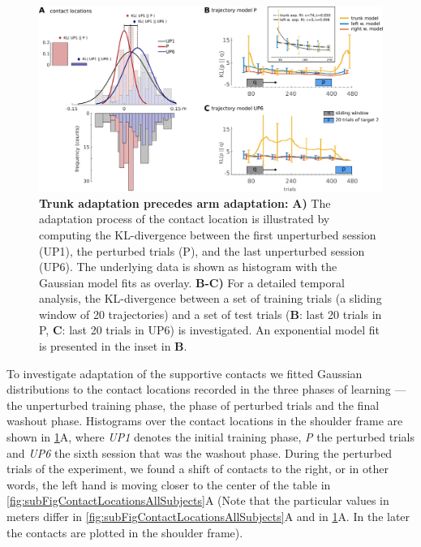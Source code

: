 \begin{figure}[t]
\centering
\includegraphics[width=\textwidth]{Elmar/picsClean/Fig4ModelComparison}
 \caption{\textbf{Trunk adaptation precedes arm adaptation:} 
 \textbf{A)} The adaptation process of the contact location is illustrated by computing the KL-divergence between the first unperturbed session (UP1), the perturbed trials (P), 
 and the last unperturbed session (UP6). The underlying data is shown as histogram with the Gaussian model fits as overlay.
 \textbf{B-C)} For a detailed temporal analysis, the KL-divergence between a set of training trials (a sliding window of 20 trajectories) and 
 a set of test trials (\textbf{B}: last 20 trials in P, \textbf{C}: last 20 trials in UP6) is investigated. 
 An exponential model fit is presented in the inset in \textbf{B}.  
}
\label{fig:OpsModelComparison}
\end{figure}

To investigate adaptation of the supportive contacts we fitted Gaussian 
distributions to the contact locations recorded in the three phases of learning 
--- the unperturbed training phase, the phase of perturbed trials and the final washout phase. 
Histograms over the contact locations in the shoulder frame are shown in \FigureAbbr \ref{fig:OpsModelComparison}A, 
where \textit{UP1} denotes the initial training phase, \textit{P} the perturbed trials and 
\textit{UP6} the sixth session that was the washout phase. During the perturbed trials of the experiment, 
we found a shift of contacts to the right, or in other words, the left hand is moving closer to the 
center of the table in \FigureAbbr \ref{fig:subFigContactLocationsAllSubjects}A 
(Note that the particular values in meters differ in \FigureAbbrP 
\ref{fig:subFigContactLocationsAllSubjects}A and in \FigureAbbrP 
\ref{fig:OpsModelComparison}A. In the later the contacts are plotted in the 
shoulder frame).  

